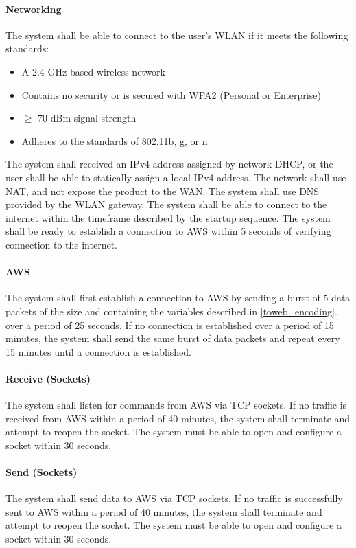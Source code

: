 \paragraph{Networking} The system shall be able to connect to the user's WLAN if it meets the following standards:
\begin{itemize}
    \item A 2.4 GHz-based wireless network
    \item Contains no security or is secured with WPA2 (Personal or Enterprise)
    \item $\geq$-70 dBm signal strength
    \item Adheres to the standards of 802.11b, g, or n
\end{itemize}
The system shall received an IPv4 address assigned by network DHCP, or the user shall be able to statically assign a local IPv4 address. The network shall use NAT, and not expose the product to the WAN. The system shall use DNS provided by the WLAN gateway. The system shall be able to connect to the internet within the timeframe described by the startup sequence. The system shall be ready to establish a connection to AWS within 5 seconds of verifying connection to the internet.

\paragraph{AWS} The system shall first establish a connection to AWS by sending a burst of 5 data packets of the size and containing the variables  described in \autoref{toweb_encoding}. over a period of 25 seconds. If no connection is established over a period of 15 minutes, the system shall send the same burst of data packets and repeat every 15 minutes until a connection is established.

\paragraph{Receive (Sockets)} The system shall listen for commands from AWS via TCP sockets. If no traffic is received from AWS within a period of 40 minutes, the system shall terminate and attempt to reopen the socket. The system must be able to open and configure a socket within 30 seconds.

\paragraph{Send (Sockets)} The system shall send data to AWS via TCP sockets. If no traffic is successfully sent to AWS within a period of 40 minutes, the system shall terminate and attempt to reopen the socket. The system must be able to open and configure a socket within 30 seconds.

